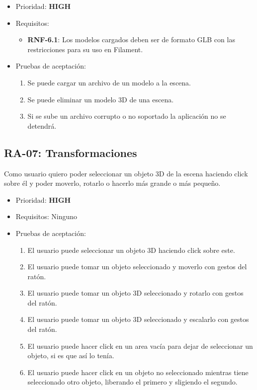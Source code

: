 \begin{itemize}
    \item Prioridad: \textbf{HIGH}
    \item Requisitos:
            \begin{itemize}
                \item \textbf{RNF-6.1}: Los modelos cargados deben ser de formato GLB con las restricciones para su uso en Filament.
            \end{itemize}
	\item Pruebas de aceptación:
	\begin{enumerate}
		\item Se puede cargar un archivo de un modelo a la escena.
		\item Se puede eliminar un modelo 3D de una escena.
		\item Si se sube un archivo corrupto o no soportado la aplicación no se detendrá.
	\end{enumerate}
\end{itemize}

\subsection{RA-07: Transformaciones}
Como usuario quiero poder seleccionar un objeto 3D de la escena haciendo click sobre él y poder moverlo, rotarlo o hacerlo más grande o más pequeño.
\begin{itemize}
    \item Prioridad: \textbf{HIGH}
    \item Requisitos: Ninguno
    \item Pruebas de aceptación:
	\begin{enumerate}
		\item El usuario puede seleccionar un objeto 3D haciendo click sobre este.
		\item El usuario puede tomar un objeto seleccionado y moverlo con gestos del ratón.
		\item El usuario puede tomar un objeto 3D seleccionado y rotarlo con gestos del ratón.
		\item El usuario puede tomar un objeto 3D seleccionado y escalarlo con gestos del ratón.
		\item El usuario puede hacer click en un area vacía para dejar de seleccionar un objeto, si es que así lo tenía.
		\item El usuario puede hacer click en un objeto no seleccionado mientras tiene seleccionado otro objeto, liberando el primero y sligiendo el segundo.
	\end{enumerate}
\end{itemize}


